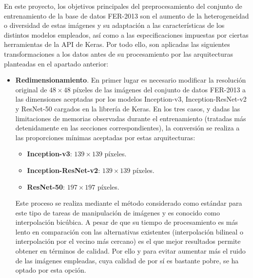 En este proyecto, los objetivos principales del preprocesamiento del conjunto de entrenamiento de la base de datos FER-2013 son el aumento de la heterogeneidad o diversidad de estas imágenes y su adaptación a las características de los distintos modelos empleados, así como a las especificaciones impuestas por ciertas herramientas de la API de Keras. Por todo ello, son aplicadas las siguientes transformaciones a los datos antes de su procesamiento por las arquitecturas planteadas en el apartado anterior:
\begin{itemize}
  \item \textbf{Redimensionamiento}. En primer lugar es necesario modificar la resolución original de $48\times 48$ píxeles de las imágenes del conjunto de datos FER-2013 a las dimensiones aceptadas por los modelos Inception-v3, Inception-ResNet-v2 y ResNet-50 cargados en la librería de Keras. En los tres casos, y dadas las limitaciones de memorias observadas durante el entrenamiento (tratadas más detenidamente en las secciones correspondientes), la conversión se realiza a las proporciones mínimas aceptadas por estas arquitecturas:
        \begin{itemize}
          \item \textbf{Inception-v3}: $139\times 139$ píxeles.
          \item \textbf{Inception-ResNet-v2}: $139\times 139$ píxeles.
          \item \textbf{ResNet-50}: $197\times 197$ píxeles.
        \end{itemize}

  Este proceso se realiza mediante el método considerado como estándar para este tipo de tareas de manipulación de imágenes y es conocido como interpolación bicúbica. A pesar de que su tiempo de procesamiento es más lento en comparación con las alternativas existentes (interpolación bilineal o interpolación por el vecino más cercano) es el que mejor resultados permite obtener en términos de calidad. Por ello y para evitar aumentar más el ruido de las imágenes empleadas, cuya calidad de por sí es bastante pobre, se ha optado por esta opción.
  

\end{itemize}
